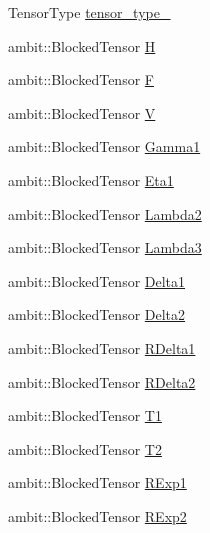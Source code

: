 \begin{DoxyCompactItemize}
\item 
Tensor\+Type \mbox{\hyperlink{classforte_1_1_m_r_d_s_r_g___s_o_af509cc91cc6b6752ae3853b97a9bba5b}{tensor\+\_\+type\+\_\+}}
\item 
ambit\+::\+Blocked\+Tensor \mbox{\hyperlink{classforte_1_1_m_r_d_s_r_g___s_o_afbe7b91e6d6572d265f5fa8fe46ec201}{H}}
\item 
ambit\+::\+Blocked\+Tensor \mbox{\hyperlink{classforte_1_1_m_r_d_s_r_g___s_o_a4667434ca029c42f59a652dfd1d44214}{F}}
\item 
ambit\+::\+Blocked\+Tensor \mbox{\hyperlink{classforte_1_1_m_r_d_s_r_g___s_o_a5282fcd5394254c50c626ad36dd6c0cd}{V}}
\item 
ambit\+::\+Blocked\+Tensor \mbox{\hyperlink{classforte_1_1_m_r_d_s_r_g___s_o_aa89c07f1752f3368da1bb79c1dc827a1}{Gamma1}}
\item 
ambit\+::\+Blocked\+Tensor \mbox{\hyperlink{classforte_1_1_m_r_d_s_r_g___s_o_a5958d2d29e9451ba38dfc6c4f34a098a}{Eta1}}
\item 
ambit\+::\+Blocked\+Tensor \mbox{\hyperlink{classforte_1_1_m_r_d_s_r_g___s_o_a363370b4d0f64a997742a29950f4ba59}{Lambda2}}
\item 
ambit\+::\+Blocked\+Tensor \mbox{\hyperlink{classforte_1_1_m_r_d_s_r_g___s_o_af9184ef26b9de44300cb3020056b9492}{Lambda3}}
\item 
ambit\+::\+Blocked\+Tensor \mbox{\hyperlink{classforte_1_1_m_r_d_s_r_g___s_o_a1ffcafde7203df4686765dd293e6d93a}{Delta1}}
\item 
ambit\+::\+Blocked\+Tensor \mbox{\hyperlink{classforte_1_1_m_r_d_s_r_g___s_o_a099d7c5f000243490746fdfd7f99539e}{Delta2}}
\item 
ambit\+::\+Blocked\+Tensor \mbox{\hyperlink{classforte_1_1_m_r_d_s_r_g___s_o_af4a07daa7ad07008a0b9ab6447fa08a2}{R\+Delta1}}
\item 
ambit\+::\+Blocked\+Tensor \mbox{\hyperlink{classforte_1_1_m_r_d_s_r_g___s_o_a1a2b77e746937553bbc3e4e643d5b4a1}{R\+Delta2}}
\item 
ambit\+::\+Blocked\+Tensor \mbox{\hyperlink{classforte_1_1_m_r_d_s_r_g___s_o_afa42761edf9b73171b843cbb11b575c1}{T1}}
\item 
ambit\+::\+Blocked\+Tensor \mbox{\hyperlink{classforte_1_1_m_r_d_s_r_g___s_o_a43f64aec5c3777de5bc476ae946e0928}{T2}}
\item 
ambit\+::\+Blocked\+Tensor \mbox{\hyperlink{classforte_1_1_m_r_d_s_r_g___s_o_a5b4684058daa71f1030fedcef21c7855}{R\+Exp1}}
\item 
ambit\+::\+Blocked\+Tensor \mbox{\hyperlink{classforte_1_1_m_r_d_s_r_g___s_o_a614f7f3f84e8a98e9e3772bb46858ea8}{R\+Exp2}}

\end{DoxyCompactItemize}
